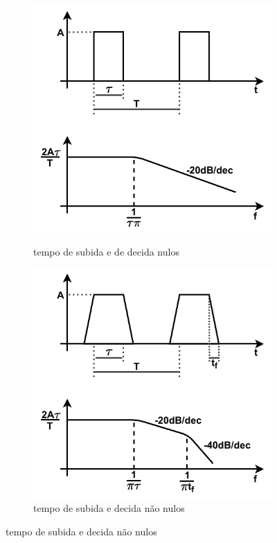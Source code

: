         \begin{figure}[H]
            \centering
            \caption{Espectro harmônico de um pulso}
            \begin{subfigure}[H]{.49\textwidth}
                \centering
                \caption{tempo de subida e de decida nulos}
                \includegraphics[scale=.9]{pdf/outros/sinal_comut_ideal.pdf}
                \label{fig:sinal_comut_ideal}
            \end{subfigure}
            \begin{subfigure}[H]{.49\textwidth}
                \centering
                \caption{tempo de subida e decida não nulos}
                \includegraphics[scale=.9]{pdf/outros/sinal_comut_real.pdf}

\end{subfigure}
\end{figure}
